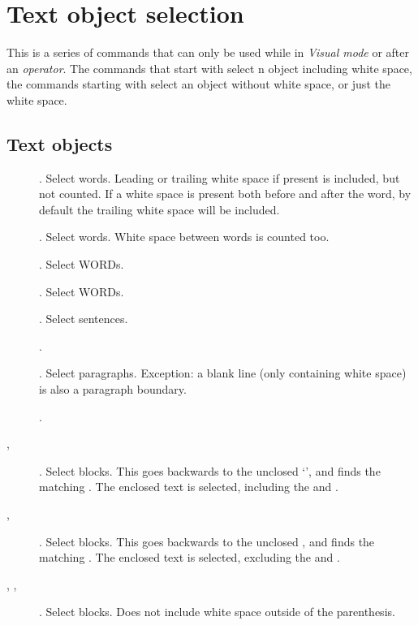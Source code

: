 \section{Text object selection}
This is a series of commands that can only be used while in \emph{Visual mode} or after an \emph{operator}. The commands that start with  select n object including white space, the commands starting with  select an  object without white space, or just the white space.

\subsection{Text objects}
\begin{description}
  \item[] . Select \syntax{[count]} words. Leading or trailing white space  if present  is included, but not counted. If a white space is present both before and after the word, by default the trailing white space will be included.
  \item[] . Select \syntax{[count]} words. White space between words is counted too.
  \item[] . Select \syntax{[count]} WORDs.
  \item[] . Select \syntax{[count]} WORDs.
  \item[] . Select \syntax{[N]} sentences.
  \item[] .
  \item[] . Select \syntax{[N]} paragraphs. Exception: a blank line (only containing white space) is also a paragraph boundary. 
  \item[] .
  \item[\syntax{a]}, \syntax{a[}] . Select \syntax{[N]} \sq{[ ]} blocks. This goes backwards to the \syntax{[N]} unclosed `\syntax{[}', and finds the matching \sq{\syntax{]}}.  The enclosed text is selected, including the \sq{\syntax{[}} and \sq{\syntax{]}}.
  \item[\syntax{i]}, \syntax{i[}] .  Select \syntax{[N]} \sq{\syntax{[ ]}} blocks.  This goes backwards to the \syntax{[N]} unclosed \sq{\syntax{[}}, and finds the matching \sq{\syntax{]}}.  The enclosed text is selected, excluding the \sq{\syntax{[}} and \sq{\syntax{]}}.
  \item[\vphantom{(}, \vphantom{)}, ] . Select \syntax{[N]} blocks. Does not include white space outside of the parenthesis.

\end{description}
